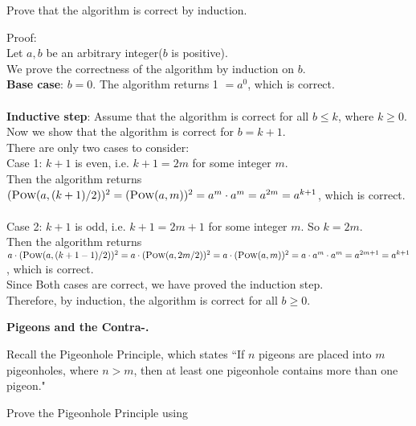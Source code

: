 \documentclass[11pt,addpoints]{exam}
\begin{document}
\begin{questions}
Prove that the algorithm is correct by induction. 
\begin{solution}
Proof:
\\Let $a,b$ be an arbitrary integer($b$ is positive). \\
We prove the correctness of the algorithm by induction on $b$.\\
\textbf{Base case}: $b=0$. The algorithm returns 1 $= a^0$, which is correct.\\\\
\textbf{Inductive step}: Assume that the algorithm is correct for all $b \leq k$, where $k \geq 0$. \\Now we show that the algorithm is correct for $b = k+1$.\\
There are only two cases to consider:
\\Case 1: $k+1$ is even, i.e. $k+1 = 2m$ for some integer $m$.\\
Then 
the algorithm returns $(\Call{Pow}{a, (k+1)/2})^2 = (\Call{Pow}{a, m})^2 = a^m \cdot a^m = a^{2m} = a^{k+1}$, which is correct.\\
\\Case 2: $k+1$ is odd, i.e. $k+1 = 2m+1$ for some integer $m$. So $k = 2m$.\\
Then
the algorithm returns $a\cdot (\Call{Pow}{a, (k+1-1)/2})^2 = a\cdot (\Call{Pow}{a, 2m/2})^2 = a\cdot (\Call{Pow}{a, m})^2 = a\cdot a^m \cdot a^m = a^{2m+1} = a^{k+1}$, which is correct.\\
Since Both cases are correct, we have proved the induction step.\\

Therefore, by induction, the algorithm is correct for all $b \geq 0$.
\end{solution}


  \question \textbf{Pigeons and the Contra-.}
  
  Recall the Pigeonhole Principle, which states ``If $n$ pigeons are placed into $m$ pigeonholes, where $n>m$, then at least one pigeonhole contains more than one pigeon." 
  
  Prove the Pigeonhole Principle using

\end{questions}
\end{document}
